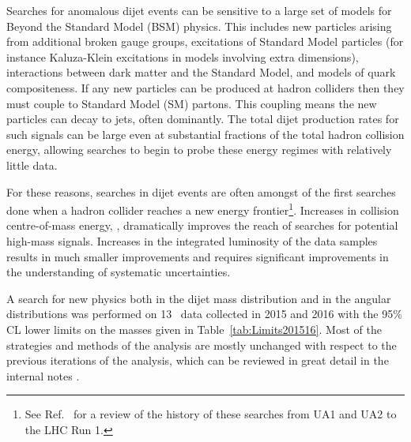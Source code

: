 


Searches for anomalous dijet events can be sensitive to a large set of models for Beyond the Standard Model (BSM) physics.
This includes new particles arising from additional broken gauge groups,
excitations of Standard Model particles (for instance Kaluza-Klein excitations in models involving extra dimensions),
interactions between dark matter and the Standard Model, and models of quark compositeness.
If any new particles can be produced at hadron colliders then they must couple to Standard Model (SM) partons.
This coupling means the new particles can decay to jets, often dominantly.
The total dijet production rates for such signals can be large even at substantial fractions of the
total hadron collision energy, allowing searches to begin to probe these energy regimes with relatively little data.

For these reasons, searches in dijet events are often amongst of the first searches done when a hadron
collider reaches a new energy frontier\footnote{See Ref.~\cite{Harris:2011bh} for a review of the history
of these searches from UA1 and UA2 to the LHC Run 1.}.  Increases in collision centre-of-mass energy, \s , 
dramatically improves the reach of searches for potential high-mass signals. 
Increases in the integrated luminosity of the data samples results in much smaller improvements and requires significant 
improvements in the understanding of systematic uncertainties. 


A search for new physics both in the dijet mass distribution and in the angular distributions was performed on 13~\TeV\xspace data collected in 2015 and 2016 \cite{EXOT-2016-21} with the  95\% CL lower limits on the masses given in Table~\ref{tab:Limits201516}. 
Most of the strategies and methods of the analysis are mostly unchanged with respect to the previous iterations of the analysis, which can be reviewed in great detail in the internal
notes \cite{Bauce:2226443}.






